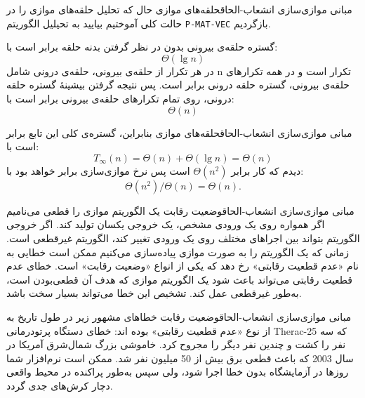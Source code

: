 \begin{itemframe-s}{مبانی موازی‌سازی انشعاب-الحاق}{حلقه‌های موازی}
\itm
حال که تحلیل حلقه‌های موازی را در حالت کلی آموختیم بیایید به تحیلیل الگوریتم
\texttt{P-MAT-VEC}
بازگردیم.
\itm

گستره حلقه‌ی بیرونی بدون در نظر گرفتن بدنه حلقه برابر است با:
$$\Theta(\lg n)$$
\itm
 در هر تکرار از حلقه‌ی بیرونی، حلقه‌ی درونی شامل n تکرار است و در همه تکرارهای حلقه‌ی بیرونی، گستره حلقه درونی برابر است.
پس نتیجه گرفتن بیشینهٔ گستره حلقه درونی، روی تمام تکرارهای حلقه‌ی بیرونی برابر است با:
$$\Theta(n)$$

\end{itemframe-s}


\begin{itemframe-s}{مبانی موازی‌سازی انشعاب-الحاق}{حلقه‌های موازی}
\itm
بنابراین، گستره‌ی کلی این تابع برابر است با:
$$T_\infty(n) = \Theta(n) + \Theta(\lg n) = \Theta(n)$$
\itm
دیدم که کار برابر
$Θ(n^2)$
است پس نرخ موازی‌سازی برابر خواهد بود با:
$$
\Theta(n^2) / \Theta(n) = \Theta(n).
$$
\end{itemframe-s}


\begin{itemframe-s}{مبانی موازی‌سازی انشعاب-الحاق}{وضعیت رقابت}
\itm
یک الگوریتم موازی را قطعی
می‌نامیم اگر همواره روی یک ورودی مشخص، یک خروجی یکسان تولید کند.
اگر خروجی الگوریتم بتواند بین اجراهای مختلف روی یک ورودی تغییر کند، الگوریتم غیرقطعی
است.
\itm
زمانی که یک الگوریتم را به صورت موازی پیاده‌سازی می‌کنیم ممکن است خطایی به نام «عدم قطعیت رقابتی»
رخ دهد که یکی از انواع «وضعیت رقابت»
است.
\itm
خطای عدم قطعیت رقابتی می‌تواند باعث شود یک الگوریتم موازی که هدف آن قطعی‌بودن است، به‌طور غیرقطعی عمل کند.
تشخیص این خطا می‌تواند بسیار سخت باشد.
\end{itemframe-s}


\begin{itemframe-s}{مبانی موازی‌سازی انشعاب-الحاق}{وضعیت رقابت}
\itm
خطاهای مشهور زیر در طول تاریخ به از نوع «عدم قطعیت رقابتی» بوده اند:
\itm[1]
خطای دستگاه پرتودرمانی Therac-25 که سه نفر را کشت و چندین نفر دیگر را مجروح کرد.
\itm[2]
خاموشی بزرگ شمال‌شرق آمریکا در سال 2003 که باعث قطعی برق بیش از 50 میلیون نفر شد.
\itm
ممکن است نرم‌افزار شما روزها در آزمایشگاه بدون خطا اجرا شود، ولی سپس به‌طور پراکنده در محیط واقعی دچار کرش‌های جدی گردد.

\end{itemframe-s}


